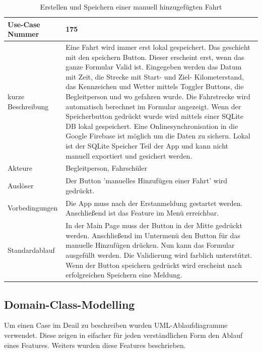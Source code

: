 \begin{table}[H]
	\centering
	\begin{tabularx}{\textwidth}{|l|X|}
		\hline
		Use-Case Nummer & 175 \\
		\hline
		kurze Beschreibung & Eine Fahrt wird immer erst lokal gespeichert. Das geschieht mit den speichern Button. Dieser erscheint erst, wenn das ganze Formular Valid ist. Eingegeben werden das Datum mit Zeit, die Strecke mit Start- und Ziel- Kilometerstand, das Kennzeichen und Wetter mittels Toggler Buttons, die Begleitperson und wo gefahren wurde. Die Fahrstrecke wird automatisch berechnet im Formular angezeigt. Wenn der Speicherbutton gedrückt wurde wird mittels einer SQLite DB lokal gespeichert. Eine Onlinesynchronisation in die Google Firebase ist möglich um die Daten zu sichern. Lokal ist der SQLite Speicher Teil der App und kann nicht manuell exportiert und gesichert werden.   \\
		\hline
		Akteure &  Begleitperson, Fahrschüler\\
		\hline
		Auslöser & Der Button 'manuelles Hinzufügen einer Fahrt' wird gedrückt. \\
		\hline
		Vorbedingungen & Die App muss nach der Erstanmeldung gestartet werden. Anschließend ist das Feature im Menü erreichbar. \\
		\hline
		Standardablauf & In der Main Page muss der Button in der Mitte gedrückt werden. Anschließend im Untermenü den Button für das manuelle Hinzufügen drücken. Nun kann das Formular ausgefüllt werden. Die Validierung wird farblich unterstützt. Wenn der Button speichern gedrückt wird erscheint nach erfolgreichen Speichern eine Meldung.\\
		\hline
	\end{tabularx}
	\caption{Erstellen und Speichern einer manuell hinzugefügten Fahrt}
	\label{tab:USE-Case3}
\end{table}

\subsection{Domain-Class-Modelling}
Um einen Case im Deail zu beschreiben wurden UML-Ablaufdiagramme verwendet. Diese zeigen in eifacher für jeden verständlichen Form den Ablauf eines Features. Weiters wurden diese Features beschrieben.  


